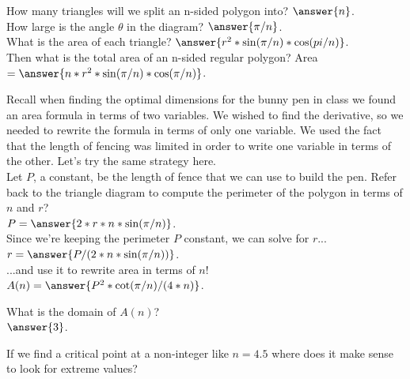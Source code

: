 \documentclass[handout,nooutcomes]{ximera}
\begin{document}
    
    

How many triangles will we split an n-sided polygon into? $\answer{n}$.\\
How large is the angle $\theta$ in the diagram? $\answer{\pi/n}$.\\
What is the area of each triangle? $\answer{r^2*\sin(\pi/n)*\cos(pi/n)}$.\\
Then what is the total area of an n-sided regular polygon? Area $=\answer{n*r^2*\sin(\pi/n)*\cos(\pi/n)}$.\\

\bigskip

\hspace{2cm}Recall when finding the optimal dimensions for the bunny pen in class we found an area formula in terms of two variables. We wished to find the derivative, so we needed to rewrite the formula in terms of only one variable. We used the fact that the length of fencing was limited in order to write one variable in terms of the other. Let's try the same strategy here.\\
Let $P$, a constant, be the length of fence that we can use to build the pen. Refer back to the triangle diagram to compute the perimeter of the polygon in terms of $n$ and $r$?\\
$P = \answer{2*r*n*\sin(\pi/n)}$.\\
Since we're keeping the perimeter $P$ constant, we can solve for $r$...\\
$r = \answer{P/(2*n*\sin(\pi/n))}$.\\
...and use it to rewrite area in terms of $n$!\\
$A(n) = \answer{P^2*\cot(\pi/n)/(4*n)}$.\\

\bigskip

What is the domain of $A(n)$? \\
  $\answer{3}$.\\
\begin{freeResponse}
If we find a critical point at a non-integer like $n = 4.5$ where does it make sense to look for extreme values?
\end{freeResponse}
\end{document}
